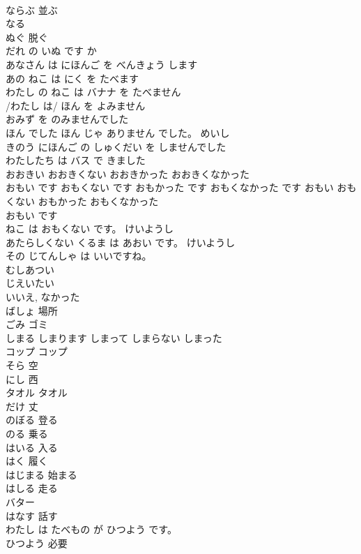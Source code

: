 \documentclass[8pt]{extreport}
\begin{document}
\begin{CJK}{UTF8}{min}
\\	ならぶ	並ぶ
\\	なる	
\\	ぬぐ	脱ぐ
\\	だれ の いぬ です か	
\\	あなさん は にほんご を べんきょう します	
\\	あの ねこ は にく を たべます	
\\	わたし の ねこ は バナナ を たべません	
\\	/わたし は/ ほん を よみません	
\\	おみず を のみませんでした	
\\	ほん でした ほん じゃ ありません でした。	めいし 
\\	きのう にほんご の しゅくだい を しませんでした	
\\	わたしたち は バス で きました	
\\	おおきい おおきくない おおきかった おおきくなかった	
\\	おもい です おもくない です おもかった です おもくなかった です	おもい おもくない おもかった おもくなかった	
\\	おもい です	
\\	ねこ は おもくない です。	けいようし
\\	あたらしくない くるま は あおい です。	けいようし
\\	その じてんしゃ は いいですね。	
\\	むしあつい	
\\	じえいたい	
\\	いいえ, なかった	
\\	ばしょ	場所
\\	ごみ	ゴミ
\\	しまる	しまります	しまって	しまらない	しまった	
\\	コップ	コップ
\\	そら	空
\\	にし	西
\\	タオル	タオル
\\	だけ	丈
\\	のぼる	登る
\\	のる	乗る
\\	はいる	入る
\\	はく	履く
\\	はじまる	始まる
\\	はしる	走る
\\	バター	
\\	はなす	話す
\\	わたし は たべもの が ひつよう です。	
\\	ひつよう	必要

\end{CJK}
\end{document}
